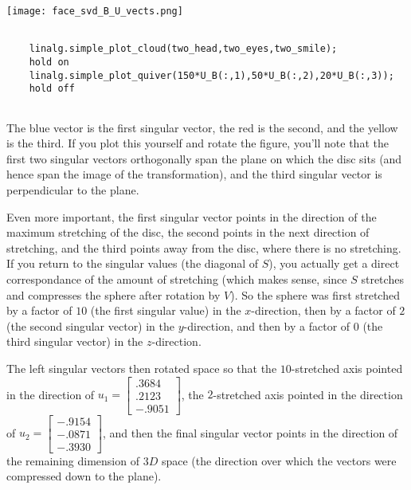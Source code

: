 \documentclass{ximera}
\begin{document}
\begin{problem}
\begin{problem}
\begin{center}
  \texttt{[image: face\_svd\_B\_U\_vects.png]}
\end{center}

\begin{hint}
  \begin{verbatim}

    linalg.simple_plot_cloud(two_head,two_eyes,two_smile);
    hold on
    linalg.simple_plot_quiver(150*U_B(:,1),50*U_B(:,2),20*U_B(:,3));
    hold off
  
  \end{verbatim}
\end{hint}

The blue vector is the first singular vector, the red is the second, and the yellow is the third. If you plot this yourself and rotate the figure, you'll note that the first two singular vectors orthogonally span the plane on which the disc sits (and hence span the image of the transformation), and the third singular vector is perpendicular to the plane. 

Even more important, the first singular vector points in the direction of the maximum stretching of the disc, the second points in the next direction of stretching, and the third points away from the disc, where there is no stretching. If you return to the singular values (the diagonal of $S$), you actually get a direct correspondance of the amount of stretching (which makes sense, since $S$ stretches and compresses the sphere after rotation by $V$). So the sphere was first stretched by a factor of $10$ (the first singular value) in the $x$-direction, then by a factor of $2$ (the second singular vector) in the $y$-direction, and then by a factor of $0$ (the third singular vector) in the $z$-direction. 

The left singular vectors then rotated space so that the $10$-stretched axis pointed in the direction of $u_1=\begin{bmatrix}.3684\\.2123\\-.9051\end{bmatrix}$, the $2$-stretched axis pointed in the direction of $u_2=\begin{bmatrix}-.9154\\-.0871\\-.3930\end{bmatrix}$, and then the final singular vector points in the direction of the remaining dimension of $3D$ space (the direction over which the vectors were compressed down to the plane).


\end{problem}
\end{problem}
\end{document}
